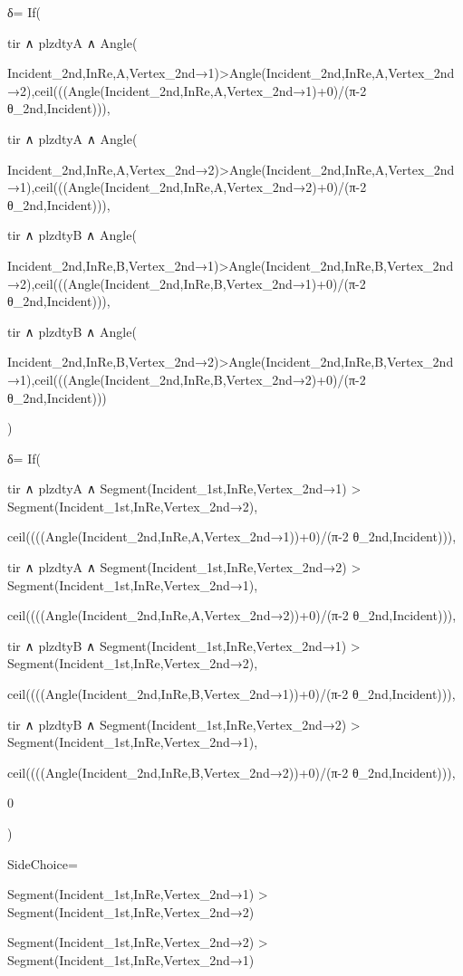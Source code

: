 δ=
  If(

    tir ∧ plzdtyA ∧ Angle(

      Incident_{2nd,InRe},A,Vertex_{2nd→1})>Angle(Incident_{2nd,InRe},A,Vertex_{2nd→2}),ceil(((Angle(Incident_{2nd,InRe},A,Vertex_{2nd→1})+0)/(π-2 θ_{2nd,Incident}))),

    tir ∧ plzdtyA ∧ Angle(
      
      Incident_{2nd,InRe},A,Vertex_{2nd→2})>Angle(Incident_{2nd,InRe},A,Vertex_{2nd→1}),ceil(((Angle(Incident_{2nd,InRe},A,Vertex_{2nd→2})+0)/(π-2 θ_{2nd,Incident}))),

    tir ∧ plzdtyB ∧ Angle(

      Incident_{2nd,InRe},B,Vertex_{2nd→1})>Angle(Incident_{2nd,InRe},B,Vertex_{2nd→2}),ceil(((Angle(Incident_{2nd,InRe},B,Vertex_{2nd→1})+0)/(π-2 θ_{2nd,Incident}))),

    tir ∧ plzdtyB ∧ Angle(

      Incident_{2nd,InRe},B,Vertex_{2nd→2})>Angle(Incident_{2nd,InRe},B,Vertex_{2nd→1}),ceil(((Angle(Incident_{2nd,InRe},B,Vertex_{2nd→2})+0)/(π-2 θ_{2nd,Incident})))

    )

  δ=
    If(

      tir ∧ plzdtyA ∧ Segment(Incident_{1st,InRe},Vertex_{2nd→1}) > Segment(Incident_{1st,InRe},Vertex_{2nd→2}),

      ceil((((Angle(Incident_{2nd,InRe},A,Vertex_{2nd→1}))+0)/(π-2 θ_{2nd,Incident}))),
      
      tir ∧ plzdtyA ∧ Segment(Incident_{1st,InRe},Vertex_{2nd→2}) > Segment(Incident_{1st,InRe},Vertex_{2nd→1}),
      
      ceil((((Angle(Incident_{2nd,InRe},A,Vertex_{2nd→2}))+0)/(π-2 θ_{2nd,Incident}))),
      
      tir ∧ plzdtyB ∧ Segment(Incident_{1st,InRe},Vertex_{2nd→1}) > Segment(Incident_{1st,InRe},Vertex_{2nd→2}),

      ceil((((Angle(Incident_{2nd,InRe},B,Vertex_{2nd→1}))+0)/(π-2 θ_{2nd,Incident}))),
      
      tir ∧ plzdtyB ∧ Segment(Incident_{1st,InRe},Vertex_{2nd→2}) > Segment(Incident_{1st,InRe},Vertex_{2nd→1}),
      
      ceil((((Angle(Incident_{2nd,InRe},B,Vertex_{2nd→2}))+0)/(π-2 θ_{2nd,Incident}))),

      0
  
    )   

  SideChoice=

      Segment(Incident_{1st,InRe},Vertex_{2nd→1}) > Segment(Incident_{1st,InRe},Vertex_{2nd→2})

      Segment(Incident_{1st,InRe},Vertex_{2nd→2}) > Segment(Incident_{1st,InRe},Vertex_{2nd→1})